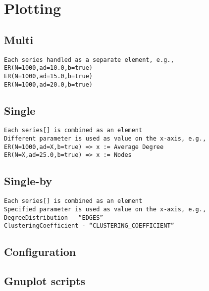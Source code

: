 
\section{Plotting}
\label{sec:plotting}


\subsection{Multi}
\label{sec:plotting:multi}

\begin{verbatim}
Each series handled as a separate element, e.g.,
ER(N=1000,ad=10.0,b=true)
ER(N=1000,ad=15.0,b=true)
ER(N=1000,ad=20.0,b=true)
\end{verbatim}



\subsection{Single}
\label{sec:plotting:single}

\begin{verbatim}
Each series[] is combined as an element
Different parameter is used as value on the x-axis, e.g.,
ER(N=1000,ad=X,b=true) => x := Average Degree
ER(N=X,ad=25.0,b=true) => x := Nodes
\end{verbatim}




\subsection{Single-by}
\label{sec:plotting:single-by}

\begin{verbatim}
Each series[] is combined as an element
Specified parameter is used as value on the x-axis, e.g.,
DegreeDistribution - “EDGES”
ClusteringCoefficient - “CLUSTERING_COEFFICIENT”
\end{verbatim}





\subsection{Configuration}
\label{sec:plotting:configuration}







\subsection{Gnuplot scripts}
\label{sec:plotting:gnuplot}




